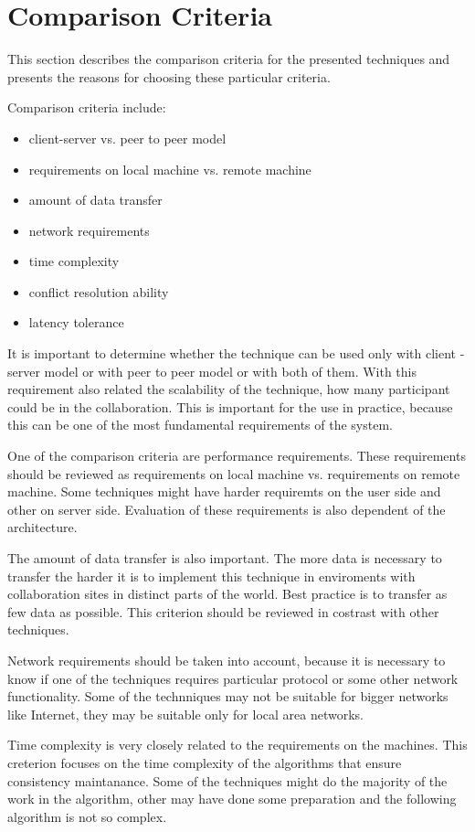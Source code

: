 \documentclass[12pt,oneside]{fithesis2}
\begin{document}
\section{Comparison Criteria}
This section describes the comparison criteria for the presented techniques and presents the reasons for choosing these particular criteria.
\par Comparison criteria include:
\begin{itemize}
\item client-server vs. peer to peer model
\item requirements on local machine vs. remote machine
\item amount of data transfer
\item network requirements
\item time complexity
\item conflict resolution ability
\item latency tolerance
\end{itemize}
\par It is important to determine whether the technique can be used only with client - server model or with peer to peer model or with both of them. With this requirement also related the scalability of the technique, how many participant could be in the collaboration. This is important for the use in practice, because this can be one of the most fundamental requirements of the system.
\par One of the comparison criteria are performance requirements. These requirements should be reviewed as requirements on local machine vs. requirements on remote machine. Some techniques might have harder requiremts on the user side and other on server side.  Evaluation of these requirements is also dependent of the architecture.
\par The amount of data transfer is also important. The more data is necessary to transfer the harder it is to implement this technique in enviroments with collaboration sites in distinct parts of the world. Best practice is to transfer as few data as possible. This criterion should be reviewed in costrast with other techniques.
\par Network requirements should be taken into account, because it is necessary to know if one of the techniques requires particular protocol or some other network functionality. Some of the technniques may not be suitable for bigger networks like Internet, they may be suitable only for local area networks.
\par Time complexity is very closely related to the requirements on the machines. This creterion focuses on the time complexity of the algorithms that ensure consistency maintanance. Some of the techniques might do the majority of the work in the algorithm, other may have done some preparation and the following algorithm is not so complex.
\end{document}
